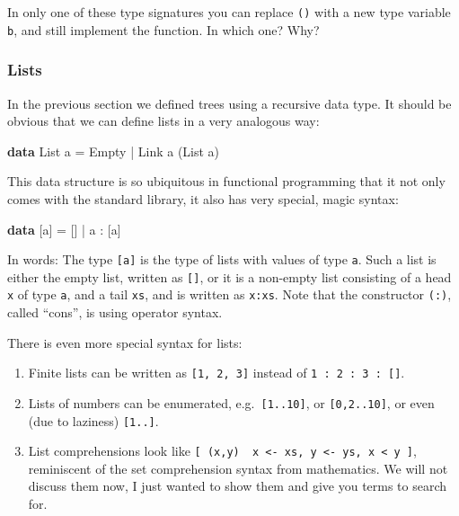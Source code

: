 \documentclass[11pt,
  american,
  DIV13]{article}
\newenvironment{Shaded}{}{}
\newcommand{\DataTypeTok}[1]{\textcolor[rgb]{0.56,0.13,0.00}{#1}}
\newcommand{\KeywordTok}[1]{\textcolor[rgb]{0.00,0.44,0.13}{\textbf{#1}}}
\newcommand{\NormalTok}[1]{#1}
\newcommand{\OperatorTok}[1]{\textcolor[rgb]{0.40,0.40,0.40}{#1}}
\newcommand{\OtherTok}[1]{\textcolor[rgb]{0.00,0.44,0.13}{#1}}
\providecommand{\tightlist}{%
  \setlength{\itemsep}{0pt}\setlength{\parskip}{0pt}}
\begin{document}
In only one of these type signatures you can replace \texttt{()} with a
new type variable \texttt{b}, and still implement the function. In which
one? Why?

\hypertarget{lists}{%
\subsubsection{Lists}\label{lists}}

In the previous section we defined trees using a recursive data type. It
should be obvious that we can define lists in a very analogous way:

\begin{Shaded}
\begin{Highlighting}[]
\KeywordTok{data} \DataTypeTok{List}\NormalTok{ a }\OtherTok{=} \DataTypeTok{Empty} \OperatorTok{|} \DataTypeTok{Link}\NormalTok{ a (}\DataTypeTok{List}\NormalTok{ a)}
\end{Highlighting}
\end{Shaded}

This data structure is so ubiquitous in functional programming that it
not only comes with the standard library, it also has very special,
magic syntax:

\begin{Shaded}
\begin{Highlighting}[]
\KeywordTok{data}\NormalTok{ [a] }\OtherTok{=}\NormalTok{ [] }\OperatorTok{|}\NormalTok{ a }\OperatorTok{:}\NormalTok{ [a]}
\end{Highlighting}
\end{Shaded}

In words: The type \texttt{{[}a{]}} is the type of lists with values of
type \texttt{a}. Such a list is either the empty list, written as
\texttt{{[}{]}}, or it is a non-empty list consisting of a head
\texttt{x} of type \texttt{a}, and a tail \texttt{xs}, and is written as
\texttt{x:xs}. Note that the constructor \texttt{(:)}, called ``cons'',
is using operator syntax.

There is even more special syntax for lists:

\begin{enumerate}
\def\labelenumi{\arabic{enumi}.}
\tightlist
\item
  Finite lists can be written as \texttt{{[}1,\ 2,\ 3{]}} instead of
  \texttt{1\ :\ 2\ :\ 3\ :\ {[}{]}}.
\item
  Lists of numbers can be enumerated, e.g.~\texttt{{[}1..10{]}}, or
  \texttt{{[}0,2..10{]}}, or even (due to laziness) \texttt{{[}1..{]}}.
\item
  List comprehensions look like
  \texttt{{[}\ (x,y)\ \textbar{}\ x\ \textless{}-\ xs,\ y\ \textless{}-\ ys,\ x\ \textless{}\ y\ {]}},
  reminiscent of the set comprehension syntax from mathematics. We will
  not discuss them now, I just wanted to show them and give you terms to
  search for.
\end{enumerate}
\end{document}
